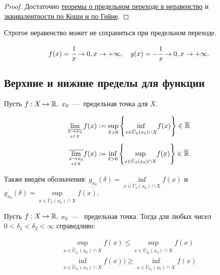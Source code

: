 \begin{proof}
    Достаточно \hyperlink{thm2.3}{теоремы о предельном переходе в неравенство} и \hyperlink{thm4.3}{эквивалентности по Коши и по Гейне}.
\end{proof}

\begin{note}
    Строгое неравенство может не сохраниться при предельном переходе.
\end{note}
\begin{example}
    $$f(x) = \cfrac{1}{x} \to 0, x\to +\infty, \quad g(x) = -\cfrac{1}{x} \to 0, x\to +\infty.$$
\end{example}

\subsection{Верхние и нижние пределы для функции}

\begin{definition}
    Пусть  $f: X \mapsto \mathbb{R},\  x_{0}$~---~предельная точка для $X$. 
   
    $$ \lim\limits_{\overline{\underset{x \in X}{x\to x_0}}} f(x) := \underset{\delta > 0}{\sup}\left\{ \underset{x\in \mathring{U}_{\delta} (x_{0}) \cap X}{\inf} f(x)\right\} \in \overline{\mathbb{R}} $$
    $$ \overline{\lim\limits_{\underset{x \in X}{x\to x_0}}} f(x) := \underset{\delta > 0}{\inf}\left\{ \underset{x\in \mathring{U}_{\delta} (x_{0}) \cap X}{\sup} f(x)\right\} \in \overline{\mathbb{R}}$$

    Также введём обозначения: $\underline{g_{x_{0}}} (\delta) = \underset{x\in \mathring{U}_{\delta} (x_{0}) \cap X}{\inf} f (x)$ и $\overline{g_{x_{0}}} (\delta) = \underset{x\in \mathring{U}_{\delta} (x_{0}) \cap X}{\sup} f (x).$
    
\end{definition}

\begin{lemma}
     Пусть $f: X \mapsto \mathbb{R}, $ $x_{0}$~---~ предельная точка. Тогда для любых чисел $0 < \delta_{1} <\delta_{2} < \infty$ справедливо: 
     
     $$\begin{gathered}
     	\underset{x\in \mathring{U}_{\delta_{1}} (x_{0}) \cap X}{\sup} f (x) \leq \underset{x\in \mathring{U}_{\delta_{2}} (x_{0}) \cap X}{\sup} f (x) \\
     	\underset{x\in \mathring{U}_{\delta_{1}} (x_{0}) \cap X}{\inf} f (x)) \geq \underset{x\in \mathring{U}_{\delta_{2}} (x_{0}) \cap X}{\inf} f (x)
     \end{gathered}$$
\end{lemma}

